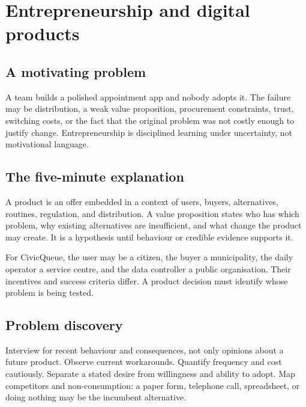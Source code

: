 \chapter{Entrepreneurship and digital products}
\label{ch:entrepreneurship}

\section{A motivating problem}
A team builds a polished appointment app and nobody adopts it. The failure may be distribution, a weak value proposition, procurement constraints, trust, switching costs, or the fact that the original problem was not costly enough to justify change. Entrepreneurship is disciplined learning under uncertainty, not motivational language.


\section{The five-minute explanation}
A product is an offer embedded in a context of users, buyers, alternatives, routines, regulation, and distribution. A value proposition states who has which problem, why existing alternatives are insufficient, and what change the product may create. It is a hypothesis until behaviour or credible evidence supports it.

For CivicQueue, the user may be a citizen, the buyer a municipality, the daily operator a service centre, and the data controller a public organisation. Their incentives and success criteria differ. A product decision must identify whose problem is being tested.

\section{Problem discovery}
Interview for recent behaviour and consequences, not only opinions about a future product. Observe current workarounds. Quantify frequency and cost cautiously. Separate a stated desire from willingness and ability to adopt. Map competitors and non-consumption: a paper form, telephone call, spreadsheet, or doing nothing may be the incumbent alternative.

